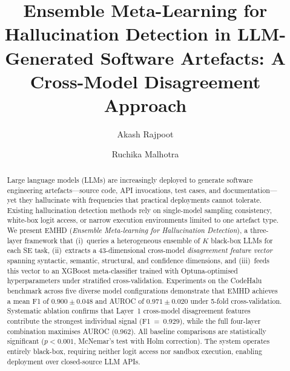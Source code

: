 \documentclass{svproc}
\newcommand{\method}{\textsc{EMHD}}
\begin{document}
\mainmatter

\title{Ensemble Meta-Learning for Hallucination Detection in LLM-Generated Software Artefacts: A Cross-Model Disagreement Approach}


\author{Akash Rajpoot \and Ruchika Malhotra}



\maketitle

\begin{abstract}
Large language models (LLMs) are increasingly deployed to generate software engineering artefacts---source code, API invocations, test cases, and documentation---yet they hallucinate with frequencies that practical deployments cannot tolerate. Existing hallucination detection methods rely on single-model sampling consistency, white-box logit access, or narrow execution environments limited to one artefact type. We present \method{} (\textit{Ensemble Meta-learning for Hallucination Detection}), a three-layer framework that (i)~queries a heterogeneous ensemble of $K$ black-box LLMs for each SE task, (ii)~extracts a 43-dimensional cross-model \emph{disagreement feature vector} spanning syntactic, semantic, structural, and confidence dimensions, and (iii)~feeds this vector to an XGBoost meta-classifier trained with Optuna-optimised hyperparameters under stratified cross-validation. Experiments on the CodeHalu benchmark across five diverse model configurations demonstrate that \method{} achieves a mean F1 of $0.900 \pm 0.048$ and AUROC of $0.971 \pm 0.020$ under 5-fold cross-validation. Systematic ablation confirms that Layer~1 cross-model disagreement features contribute the strongest individual signal (F1~=~0.929), while the full four-layer combination maximises AUROC (0.962). All baseline comparisons are statistically significant ($p < 0.001$, McNemar's test with Holm correction). The system operates entirely black-box, requiring neither logit access nor sandbox execution, enabling deployment over closed-source LLM APIs.
\end{abstract}
\end{document}
